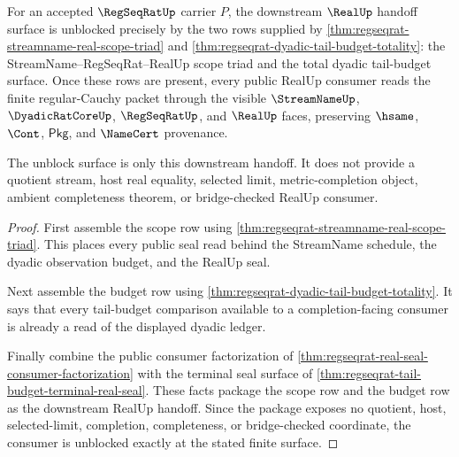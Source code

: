 \begin{theorem}
\label{thm:regseqrat-consumer-seal-unblock-surface}
For an accepted $\RegSeqRatUp$ carrier $P$, the downstream $\RealUp$ handoff
surface is unblocked precisely by the two rows supplied by
\autoref{thm:regseqrat-streamname-real-scope-triad} and
\autoref{thm:regseqrat-dyadic-tail-budget-totality}: the StreamName--RegSeqRat--RealUp
scope triad and the total dyadic tail-budget surface. Once these rows are
present, every public RealUp consumer reads the finite regular-Cauchy packet
through the visible $\StreamNameUp$, $\DyadicRatCoreUp$, $\RegSeqRatUp$, and
$\RealUp$ faces, preserving $\hsame$, $\Cont$, $\mathsf{Pkg}$, and
$\NameCert$ provenance.

The unblock surface is only this downstream handoff. It does not provide a
quotient stream, host real equality, selected limit, metric-completion object,
ambient completeness theorem, or bridge-checked RealUp consumer.
\end{theorem}
\begin{proof}
First assemble the scope row using
\autoref{thm:regseqrat-streamname-real-scope-triad}. This places every public
seal read behind the StreamName schedule, the dyadic observation budget, and
the RealUp seal.

Next assemble the budget row using
\autoref{thm:regseqrat-dyadic-tail-budget-totality}. It says that every
tail-budget comparison available to a completion-facing consumer is already a
read of the displayed dyadic ledger.

Finally combine the public consumer factorization of
\autoref{thm:regseqrat-real-seal-consumer-factorization} with the terminal
seal surface of \autoref{thm:regseqrat-tail-budget-terminal-real-seal}. These
facts package the scope row and the budget row as the downstream RealUp
handoff. Since the package exposes no quotient, host, selected-limit,
completion, completeness, or bridge-checked coordinate, the consumer is
unblocked exactly at the stated finite surface.
\end{proof}
